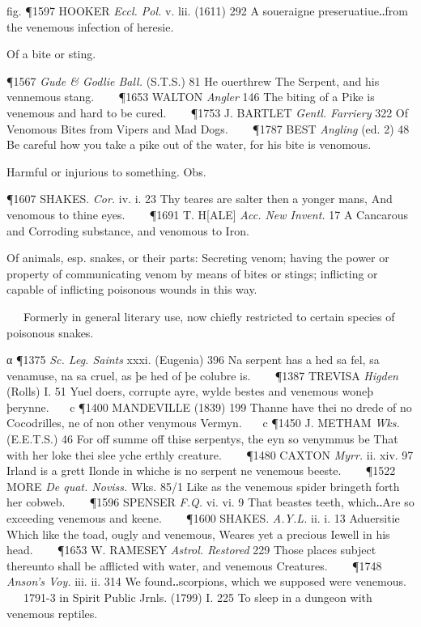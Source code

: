\begin{description}[wide, labelwidth=!, labelindent=0pt]
\begin{myenumerate}
fig. \P 1597 HOOKER  \textit{Eccl. Pol.} v. lii. (1611) 292 A soueraigne preseruatiue‥from the venemous infection of heresie.

 Of a bite or sting.

\P 1567 \textit{Gude \& Godlie  Ball.} (S.T.S.) 81 He ouerthrew The Serpent, and his vennemous stang.    
\P 1653 WALTON  \textit{Angler} 146 The biting of a Pike is venemous and hard to be cured.    
\P 1753 J. BARTLET  \textit{Gentl. Farriery} 322 Of Venomous Bites from Vipers and Mad Dogs.    
\P 1787 BEST  \textit{Angling} (ed. 2) 48 Be careful how you take a pike out of the water, for his bite is venomous.

 Harmful or injurious to something. Obs.

\P 1607 SHAKES.  \textit{Cor.} iv. i. 23 Thy teares are salter then a yonger mans, And venomous to thine eyes.    
\P 1691 T. H[ALE]  \textit{Acc. New Invent.} 17 A Cancarous and Corroding substance, and venomous to Iron.

 Of animals, esp. snakes, or their parts: Secreting venom; having the power or property of communicating venom by means of bites or stings; inflicting or capable of inflicting poisonous wounds in this way.

   Formerly in general literary use, now chiefly restricted to certain species of poisonous snakes.

α \P 1375  \textit{Sc. Leg. Saints} xxxi. (Eugenia) 396 Na serpent has a hed sa fel, sa venamuse, na sa cruel, as þe hed of þe colubre is.    
\P 1387 TREVISA  \textit{Higden} (Rolls) I. 51 Yuel doers, corrupte ayre, wylde bestes and venemous woneþ þerynne.    c 
\P 1400 MANDEVILLE  (1839) 199 Thanne have thei no drede of no Cocodrilles, ne of non other venymous Vermyn.    c 
\P 1450 J. METHAM  \textit{Wks.} (E.E.T.S.) 46 For off summe off thise serpentys, the eyn so venymmus be That with her loke thei slee yche erthly creature.    
\P 1480 CAXTON  \textit{Myrr.} ii. xiv. 97 Irland is a grett Ilonde in whiche is no serpent ne venemous beeste.    
\P 1522 MORE  \textit{De quat. Noviss.} Wks. 85/1 Like as the venemous spider bringeth forth her cobweb.    
\P 1596 SPENSER  \textit{F.Q.} vi. vi. 9 That beastes teeth, which‥Are so exceeding venemous and keene.    
\P 1600 SHAKES.  \textit{A.Y.L.} ii. i. 13 Aduersitie Which like the toad, ougly and venemous, Weares yet a precious Iewell in his head.    
\P 1653 W. RAMESEY  \textit{Astrol. Restored} 229 Those places subject thereunto shall be afflicted with water, and venemous Creatures.    
\P 1748  \textit{Anson's Voy.} iii. ii. 314 We found‥scorpions, which we supposed were venemous.    1791-3 in Spirit Public Jrnls. (1799) I. 225 To sleep in a dungeon with venemous reptiles.


\end{myenumerate}
\end{description}
